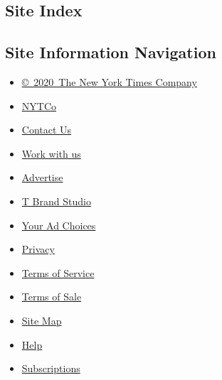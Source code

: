 \hypertarget{site-index}{%
\subsection{Site Index}\label{site-index}}

\hypertarget{site-information-navigation}{%
\subsection{Site Information
Navigation}\label{site-information-navigation}}

\begin{itemize}
\tightlist
\item
  \href{https://help.nytimes3xbfgragh.onion/hc/en-us/articles/115014792127-Copyright-notice}{©~2020~The
  New York Times Company}
\end{itemize}

\begin{itemize}
\tightlist
\item
  \href{https://www.nytco.com/}{NYTCo}
\item
  \href{https://help.nytimes3xbfgragh.onion/hc/en-us/articles/115015385887-Contact-Us}{Contact
  Us}
\item
  \href{https://www.nytco.com/careers/}{Work with us}
\item
  \href{https://nytmediakit.com/}{Advertise}
\item
  \href{http://www.tbrandstudio.com/}{T Brand Studio}
\item
  \href{https://www.nytimes3xbfgragh.onion/privacy/cookie-policy\#how-do-i-manage-trackers}{Your
  Ad Choices}
\item
  \href{https://www.nytimes3xbfgragh.onion/privacy}{Privacy}
\item
  \href{https://help.nytimes3xbfgragh.onion/hc/en-us/articles/115014893428-Terms-of-service}{Terms
  of Service}
\item
  \href{https://help.nytimes3xbfgragh.onion/hc/en-us/articles/115014893968-Terms-of-sale}{Terms
  of Sale}
\item
  \href{https://spiderbites.nytimes3xbfgragh.onion}{Site Map}
\item
  \href{https://help.nytimes3xbfgragh.onion/hc/en-us}{Help}
\item
  \href{https://www.nytimes3xbfgragh.onion/subscription?campaignId=37WXW}{Subscriptions}
\end{itemize}
